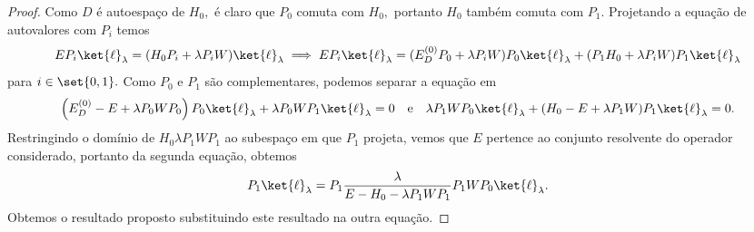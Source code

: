 \begin{proof}
    Como \(D\) é autoespaço de \(H_0,\) é claro que \(P_0\) comuta com \(H_0,\) portanto \(H_0\) também comuta com \(P_1.\) Projetando a equação de autovalores com \(P_i\) temos
    \begin{equation*}
        E P_i \ket{\ell}_\lambda = (H_0 P_i + \lambda P_i W)\ket{\ell}_\lambda \implies E P_i \ket{\ell}_\lambda = (E_D^{(0)} P_0 + \lambda P_i W)P_0\ket{\ell}_\lambda + (P_1H_0 + \lambda P_i W) P_1 \ket{\ell}_\lambda
    \end{equation*}
    para \(i \in \set{0,1}.\) Como \(P_0\) e \(P_1\) são complementares, podemos separar a equação em
    \begin{equation*}
        \left(E_D^{(0)} - E+ \lambda P_0 W P_0\right) P_0 \ket{\ell}_\lambda + \lambda P_0 W P_1 \ket{\ell}_\lambda = 0
        \quad\text{e}\quad
        \lambda P_1 W P_0 \ket{\ell}_{\lambda} + (H_0 - E + \lambda P_1 W) P_1 \ket{\ell}_\lambda = 0.
    \end{equation*}
    Restringindo o domínio de \(H_0 \lambda P_1 W P_1\) ao subespaço em que \(P_1\) projeta, vemos que \(E\) pertence ao conjunto resolvente do operador considerado, portanto da segunda equação, obtemos
    \begin{equation*}
        P_1 \ket{\ell}_{\lambda} = P_1 \frac{\lambda}{E - H_0 - \lambda P_1 W P_1} P_1WP_0\ket{\ell}_\lambda.
    \end{equation*}
    Obtemos o resultado proposto substituindo este resultado na outra equação.
\end{proof}
